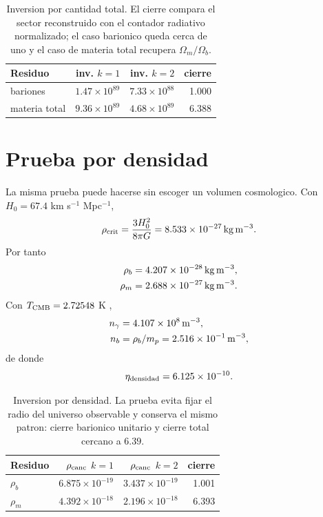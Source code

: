 \documentclass[10pt,twocolumn]{article}
\begin{document}
\begin{table}[h!]
\centering
\caption{Inversion por cantidad total. El cierre compara el sector reconstruido con el contador radiativo normalizado; el caso barionico queda cerca de uno y el caso de materia total recupera $\Omega_m/\Omega_b$.}
\scriptsize
\begin{tabular}{lrrr}
\hline
Residuo & inv. $k=1$ & inv. $k=2$ & cierre\\
\hline
bariones & $1.47{\times}10^{89}$ & $7.33{\times}10^{88}$ & 1.000\\
materia total & $9.36{\times}10^{89}$ & $4.68{\times}10^{89}$ & 6.388\\
\hline
\end{tabular}
\end{table}

\section{Prueba por densidad}

La misma prueba puede hacerse sin escoger un volumen cosmologico. Con $H_0=67.4$ km s$^{-1}$ Mpc$^{-1}$,
\begin{equation}
\rho_{\rm crit}=\frac{3H_0^2}{8\pi G}=8.533\times10^{-27}{\rm\,kg\,m^{-3}}.
\end{equation}
Por tanto
\begin{align}
\rho_b&=4.207\times10^{-28}{\rm\,kg\,m^{-3}},\\
\rho_m&=2.688\times10^{-27}{\rm\,kg\,m^{-3}}.
\end{align}
Con $T_{\rm CMB}=2.72548$ K \cite{fixsen2009},
\begin{align}
n_\gamma&=4.107\times10^8{\rm\,m^{-3}},\\
n_b&=\rho_b/m_p=2.516\times10^{-1}{\rm\,m^{-3}},
\end{align}
de donde
\begin{equation}
\eta_{\rm densidad}=6.125\times10^{-10}.
\end{equation}

\begin{table}[h!]
\centering
\caption{Inversion por densidad. La prueba evita fijar el radio del universo observable y conserva el mismo patron: cierre barionico unitario y cierre total cercano a $6.39$.}
\scriptsize
\begin{tabular}{lrrr}
\hline
Residuo & $\rho_{\rm canc}$ $k=1$ & $\rho_{\rm canc}$ $k=2$ & cierre\\
\hline
$\rho_b$ & $6.875{\times}10^{-19}$ & $3.437{\times}10^{-19}$ & 1.001\\
$\rho_m$ & $4.392{\times}10^{-18}$ & $2.196{\times}10^{-18}$ & 6.393\\
\hline
\end{tabular}
\end{table}
\end{document}
